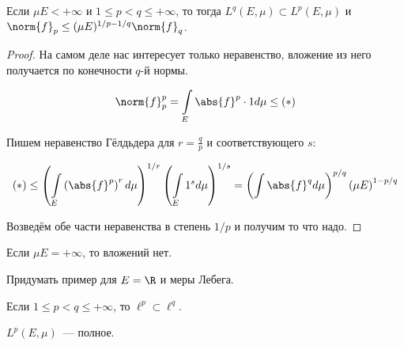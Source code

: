 \begin{theorem}
    Если $\mu E < +\infty$ и $1 \le p < q \le +\infty$, то тогда
    $L^q(E, \mu) \subset L^p(E, \mu)$ и $\norm{f}_p \le (\mu E)^{1/p - 1/q} \norm{f}_q$.
\end{theorem}

\begin{proof}
    На самом деле нас интересует только неравенство, вложение из него
    получается по конечности $q$-й нормы.

    \[
        \norm{f}_p^p = \int\limits_E \abs{f}^p \cdot 1 d\mu \le (*)
    \]

    Пишем неравенство Гёлдьдера для $r = \frac qp$ и соответствующего $s$:

    \[
        (*) \le
        \left( \int\limits_E \left( \abs{f}^p \right)^r d\mu \right)^{1/r}
        \left( \int\limits_E 1^s d\mu \right)^{1/s}
        = \left( \int \abs{f}^q d\mu \right)^{p/q}
        \left( \mu E \right)^{1-p/q}
    \]

    Возведём обе части неравенства в степень $1/p$ и получим то что надо.
\end{proof}

\begin{observation}
    Если $\mu E = +\infty$, то вложений нет.
\end{observation}

\begin{exercise}
    Придумать пример для $E = \R$ и меры Лебега.
\end{exercise}

\begin{exercise}
    Если $1 \le p < q \le +\infty$, то $\ell^p \subset \ell^q$.
\end{exercise}

\begin{theorem}
    $L^p(E, \mu)$~--- полное.
\end{theorem}

